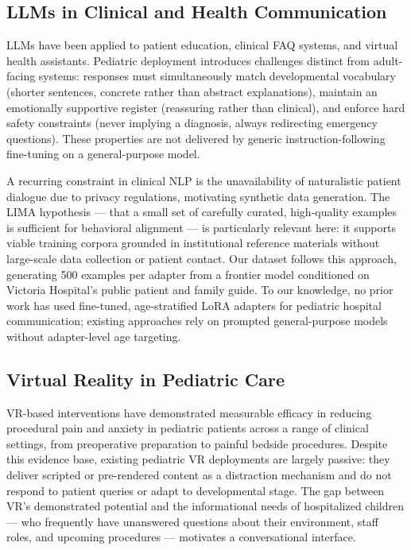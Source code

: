 \documentclass[journal]{IEEEtai}
\begin{document}
\subsection{LLMs in Clinical and Health Communication}

LLMs have been applied to patient education, clinical FAQ systems, and virtual health assistants. Pediatric deployment introduces challenges distinct from adult-facing systems: responses must simultaneously match developmental vocabulary (shorter sentences, concrete rather than abstract explanations), maintain an emotionally supportive register (reassuring rather than clinical), and enforce hard safety constraints (never implying a diagnosis, always redirecting emergency questions). These properties are not delivered by generic instruction-following fine-tuning on a general-purpose model.

A recurring constraint in clinical NLP is the unavailability of naturalistic patient dialogue due to privacy regulations, motivating synthetic data generation. The LIMA hypothesis \cite{zhou2023lima} --- that a small set of carefully curated, high-quality examples is sufficient for behavioral alignment --- is particularly relevant here: it supports viable training corpora grounded in institutional reference materials without large-scale data collection or patient contact. Our dataset follows this approach, generating 500 examples per adapter from a frontier model conditioned on Victoria Hospital's public patient and family guide. To our knowledge, no prior work has used fine-tuned, age-stratified LoRA adapters for pediatric hospital communication; existing approaches rely on prompted general-purpose models without adapter-level age targeting.

\subsection{Virtual Reality in Pediatric Care}

VR-based interventions have demonstrated measurable efficacy in reducing procedural pain and anxiety in pediatric patients across a range of clinical settings, from preoperative preparation to painful bedside procedures. Despite this evidence base, existing pediatric VR deployments are largely passive: they deliver scripted or pre-rendered content as a distraction mechanism and do not respond to patient queries or adapt to developmental stage. The gap between VR's demonstrated potential and the informational needs of hospitalized children --- who frequently have unanswered questions about their environment, staff roles, and upcoming procedures --- motivates a conversational interface.
\end{document}
